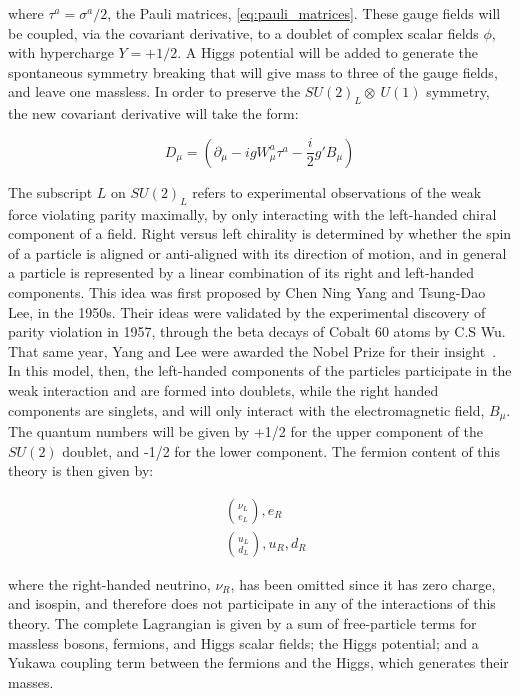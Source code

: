\noindent where $\tau^{a} = \sigma^{a}/2$, the Pauli matrices,
\ref{eq:pauli_matrices}.  These gauge fields will be coupled, via the
covariant derivative, to a doublet of complex scalar fields $\phi$,
with hypercharge $Y=+1/2$.  A Higgs potential will be added to 
generate the spontaneous symmetry breaking that will give mass to
three of the gauge fields, and leave one massless.  In order to
preserve the $SU(2)_{L}\otimes~U(1)$ symmetry, the new covariant 
derivative will take the form:

\begin{equation}\label{eq:ewk_covariant_derivative}
D_{\mu} = (\partial_{\mu} - igW_{\mu}^{a}\tau^{a} -
\frac{i}{2}g'B_{\mu})
\end{equation}

\par The subscript $L$ on $SU(2)_{L}$ refers to experimental
observations of the weak force violating parity maximally, by only
interacting with the left-handed chiral component of a field.  Right
versus left chirality is determined by whether the spin of a particle
is aligned or anti-aligned with its direction of motion, and in
general a particle is represented by a linear combination of its right and
left-handed components.  This idea was first proposed by Chen Ning
Yang and Tsung-Dao Lee, in the 1950s.  Their ideas were validated by
the experimental discovery of parity violation in 1957, through the beta decays of Cobalt
60 atoms by C.S Wu.  That same year, Yang and Lee were awarded the
Nobel Prize for their insight~\cite{th:YangLee_NobelPrize}.  In this
model, then, the left-handed components of the particles participate
in the weak interaction and are formed into doublets, while the right handed
components are singlets, and will only interact with the
electromagnetic field, $B_{\mu}$.  The quantum numbers
will be given by +1/2 for the upper component of the $SU(2)$ doublet,
and -1/2 for the lower component.  The fermion content of this theory
is then given by:

\begin{equation}\label{eq:ewk_fermion_doublets}
\begin{aligned}
&\binom{\nu_{L}}{e_{L}}, e_{R} \\
&\binom{u_{L}}{d_{L}}, u_{R}, d_{R} 
\end{aligned}
\end{equation}

\noindent where the right-handed neutrino, $\nu_{R}$, has been omitted
since it has zero charge, and isospin, and therefore does not
participate in any of the interactions of this theory.  The complete
Lagrangian is given by a sum of free-particle terms for  massless bosons,
fermions, and Higgs scalar fields; the Higgs potential; and a Yukawa
coupling term between the fermions and the Higgs, which generates
their masses. 

